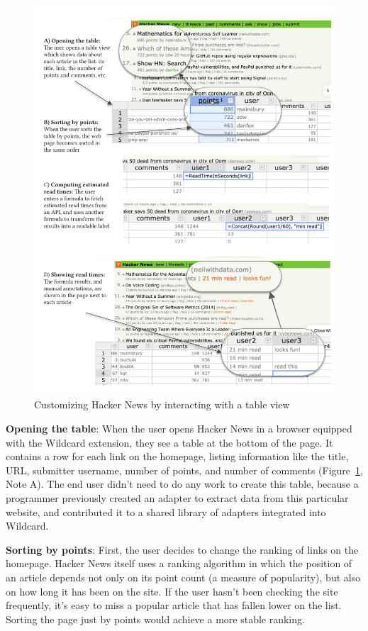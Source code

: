 \documentclass[sigplan,screen,10pt,anonymous,review]{acmart}
\begin{document}
\begin{figure}
\hypertarget{fig:hacker-news}{%
\centering
\includegraphics[width=\textwidth]{media/hacker-news.png}
\caption{Customizing Hacker News by interacting with a table view}\label{fig:hacker-news}
}
\end{figure}

\textbf{Opening the table}: When the user opens Hacker News in a browser
equipped with the Wildcard extension, they see a table at the bottom of
the page. It contains a row for each link on the homepage, listing
information like the title, URL, submitter username, number of points,
and number of comments (Figure~\ref{fig:hacker-news}, Note A). The end
user didn't need to do any work to create this table, because a
programmer previously created an adapter to extract data from this
particular website, and contributed it to a shared library of adapters
integrated into Wildcard.

\textbf{Sorting by points}: First, the user decides to change the
ranking of links on the homepage. Hacker News itself uses a ranking
algorithm in which the position of an article depends not only on its
point count (a measure of popularity), but also on how long it has been
on the site. If the user hasn't been checking the site frequently, it's
easy to miss a popular article that has fallen lower on the list.
Sorting the page just by points would achieve a more stable ranking.
\end{document}
